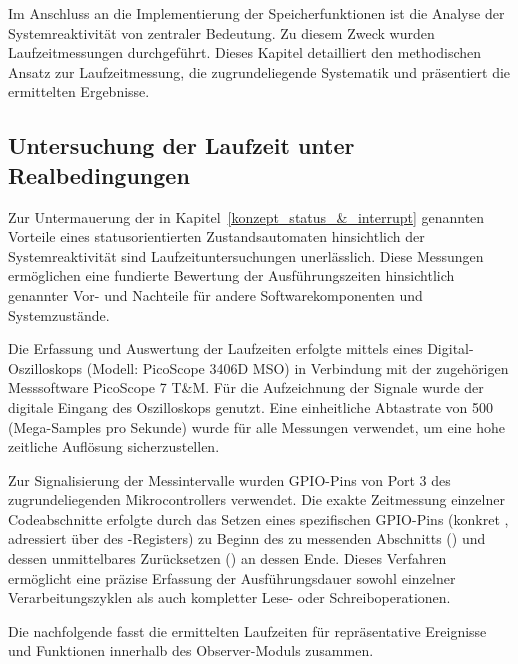 \newpage
Im Anschluss an die Implementierung der Speicherfunktionen ist die Analyse der Systemreaktivit\"at von zentraler Bedeutung. Zu diesem Zweck wurden Laufzeitmessungen durchgef\"uhrt. Dieses Kapitel detailliert den methodischen Ansatz zur Laufzeitmessung, die zugrundeliegende Systematik und pr\"asentiert die ermittelten Ergebnisse.

\subsection{Untersuchung der Laufzeit unter Realbedingungen}
\label{laufzeit}

Zur Untermauerung der in Kapitel~\ref{konzept_status_&_interrupt} genannten Vorteile eines statusorientierten Zustandsautomaten hinsichtlich der Systemreaktivit\"at sind Laufzeituntersuchungen unerl\"asslich. Diese Messungen erm\"oglichen eine fundierte Bewertung der Ausf\"uhrungszeiten hinsichtlich genannter Vor- und Nachteile f\"ur andere Softwarekomponenten und Systemzust\"ande.

Die Erfassung und Auswertung der Laufzeiten erfolgte mittels eines Digital-Oszilloskops (Modell: PicoScope 3406D MSO) in Verbindung mit der zugeh\"origen Messsoftware PicoScope 7 T\&M. F\"ur die Aufzeichnung der Signale wurde der digitale Eingang  des Oszilloskops genutzt. Eine einheitliche Abtastrate von 500  (Mega-Samples pro Sekunde) wurde f\"ur alle Messungen verwendet, um eine hohe zeitliche Aufl\"osung sicherzustellen.

Zur Signalisierung der Messintervalle wurden GPIO-Pins von Port 3 des zugrundeliegenden Mikrocontrollers verwendet. Die exakte Zeitmessung einzelner Codeabschnitte erfolgte durch das Setzen eines spezifischen GPIO-Pins (konkret , adressiert \"uber  des -Registers) zu Beginn des zu messenden Abschnitts () und dessen unmittelbares Zur\"ucksetzen () an dessen Ende. Dieses Verfahren erm\"oglicht eine pr\"azise Erfassung der Ausf\"uhrungsdauer sowohl einzelner Verarbeitungszyklen als auch kompletter Lese- oder Schreiboperationen.

Die nachfolgende  fasst die ermittelten Laufzeiten f\"ur repr\"asentative Ereignisse und Funktionen innerhalb des Observer-Moduls zusammen.

